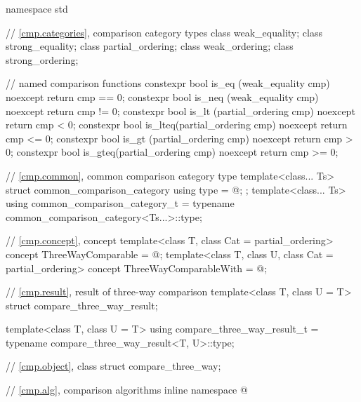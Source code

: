 %
%
%
%
%
%
%
%
%
\begin{codeblock}
namespace std {
  // \ref{cmp.categories}, comparison category types
  class weak_equality;
  class strong_equality;
  class partial_ordering;
  class weak_ordering;
  class strong_ordering;

  // named comparison functions
  constexpr bool is_eq  (weak_equality cmp) noexcept    { return cmp == 0; }
  constexpr bool is_neq (weak_equality cmp) noexcept    { return cmp != 0; }
  constexpr bool is_lt  (partial_ordering cmp) noexcept { return cmp < 0; }
  constexpr bool is_lteq(partial_ordering cmp) noexcept { return cmp <= 0; }
  constexpr bool is_gt  (partial_ordering cmp) noexcept { return cmp > 0; }
  constexpr bool is_gteq(partial_ordering cmp) noexcept { return cmp >= 0; }

  // \ref{cmp.common}, common comparison category type
  template<class... Ts>
  struct common_comparison_category {
    using type = @\seebelow@;
  };
  template<class... Ts>
    using common_comparison_category_t = typename common_comparison_category<Ts...>::type;

  // \ref{cmp.concept}, concept 
  template<class T, class Cat = partial_ordering>
    concept ThreeWayComparable = @\seebelow@;
  template<class T, class U, class Cat = partial_ordering>
    concept ThreeWayComparableWith = @\seebelow@;

  // \ref{cmp.result}, result of three-way comparison
  template<class T, class U = T> struct compare_three_way_result;

  template<class T, class U = T>
    using compare_three_way_result_t = typename compare_three_way_result<T, U>::type;

  // \ref{cmp.object}, class 
  struct compare_three_way;

  // \ref{cmp.alg}, comparison algorithms
  inline namespace @
}
\end{codeblock}

